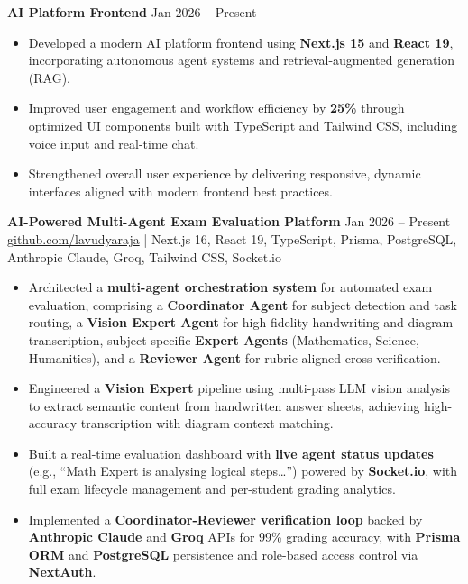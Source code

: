 \documentclass[11pt,letterpaper]{article}
\begin{document}
\vspace{4pt}
\textbf{AI Platform Frontend} \hfill Jan 2026 -- Present
\begin{itemize}
  \item Developed a modern AI platform frontend using \textbf{Next.js 15} and \textbf{React 19}, incorporating autonomous agent systems and retrieval-augmented generation (RAG).
  \item Improved user engagement and workflow efficiency by \textbf{25\%} through optimized UI components built with TypeScript and Tailwind CSS, including voice input and real-time chat.
  \item Strengthened overall user experience by delivering responsive, dynamic interfaces aligned with modern frontend best practices.
\end{itemize}

\vspace{4pt}
\textbf{AI-Powered Multi-Agent Exam Evaluation Platform} \hfill Jan 2026 -- Present \\
\href{https://github.com/lavudyaraja}{github.com/lavudyaraja} \;|\; Next.js 16, React 19, TypeScript, Prisma, PostgreSQL, Anthropic Claude, Groq, Tailwind CSS, Socket.io
\begin{itemize}
  \item Architected a \textbf{multi-agent orchestration system} for automated exam evaluation, comprising a \textbf{Coordinator Agent} for subject detection and task routing, a \textbf{Vision Expert Agent} for high-fidelity handwriting and diagram transcription, subject-specific \textbf{Expert Agents} (Mathematics, Science, Humanities), and a \textbf{Reviewer Agent} for rubric-aligned cross-verification.
  \item Engineered a \textbf{Vision Expert} pipeline using multi-pass LLM vision analysis to extract semantic content from handwritten answer sheets, achieving high-accuracy transcription with diagram context matching.
  \item Built a real-time evaluation dashboard with \textbf{live agent status updates} (e.g., ``Math Expert is analysing logical steps\ldots'') powered by \textbf{Socket.io}, with full exam lifecycle management and per-student grading analytics.
  \item Implemented a \textbf{Coordinator-Reviewer verification loop} backed by \textbf{Anthropic Claude} and \textbf{Groq} APIs for 99\% grading accuracy, with \textbf{Prisma ORM} and \textbf{PostgreSQL} persistence and role-based access control via \textbf{NextAuth}.
\end{itemize}
\end{document}
